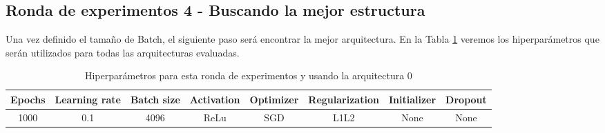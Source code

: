 \documentclass{article}
\begin{document}
      \subsection{Ronda de experimentos 4 - Buscando la mejor estructura}
		\label{j-s-a0-e4} %
			Una vez definido el tama\~{n}o de Batch, el siguiente paso ser\'a encontrar la mejor arquitectura. En la Tabla \ref{tab:hip-j-a0-e4} veremos los hiperpar\'ametros que ser\'an utilizados para todas las arquitecturas evaluadas.
            
			\begin{table}[h!]
				\begin{center}
					\begin{tabular}{| c | c | c | c | c | c | c | c |}
						\textbf{Epochs} & \textbf{Learning rate} & \textbf{Batch size} & \textbf{Activation} & \textbf{Optimizer} & \textbf{Regularization} & \textbf{Initializer} & \textbf{Dropout}\\ \hline
						1000 & 0.1 & 4096 & ReLu & SGD & L1L2 & None & None
					\end{tabular}
					\caption{Hiperpar\'ametros para esta ronda de experimentos y usando la arquitectura 0}
					\label{tab:hip-j-a0-e4}
				\end{center}
			\end{table}
			
\end{document}
